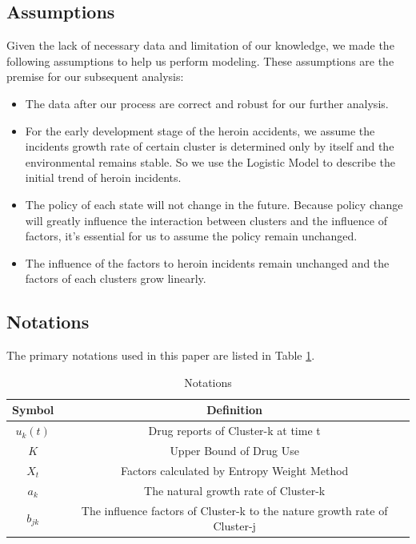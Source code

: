 \documentclass[12pt]{article}
\begin{document}
\subsection{Assumptions}
Given the lack of necessary data and limitation of our knowledge, we made the following assumptions to help us perform modeling. These assumptions are the premise for our subsequent analysis:
\begin{itemize}
	\item The data after our process are correct and robust for our further analysis.
	\item For the early development stage of the heroin accidents, we assume the incidents growth rate of certain cluster is determined only by itself and the environmental remains stable. So we use the Logistic Model to describe the initial trend of heroin incidents.
	\item The policy of each state will not change in the future. Because policy change will greatly influence the interaction between clusters and the influence of factors, it’s essential for us to assume the policy remain unchanged.
	\item The influence of the factors to heroin incidents remain unchanged and the factors of each clusters grow linearly.
\end{itemize}

\subsection{Notations}
The primary notations used in this paper are listed in Table \ref{tb:notation}.
\begin{table}[!htbp]
\small
\begin{center}
\caption{Notations}
\begin{tabular}{cc}
	\toprule
	\multicolumn{1}{m{3cm}}{\centering Symbol}
	&\multicolumn{1}{m{8cm}}{\centering Definition}\\
	\midrule
	$u_{k}(t)$ &Drug reports of Cluster-k at time t\\
	$ K $ & Upper Bound of Drug Use \\
	$X_{t}$ & Factors calculated by Entropy Weight Method\\
	$a_{k}$ & The natural growth rate of Cluster-k\\
	$b_{jk}$ & The influence factors of Cluster-k to the nature growth rate of Cluster-j\\
	\bottomrule
\end{tabular}\label{tb:notation}
\end{center}
\end{table}
\end{document}
